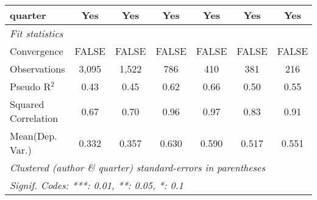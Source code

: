 \begin{tabular}{lcccccc}
   quarter                                                    & Yes           & Yes           & Yes           & Yes     & Yes           & Yes\\  
   \midrule
   \emph{Fit statistics}\\
   Convergence                                                &FALSE          & FALSE         & FALSE         & FALSE   & FALSE         & FALSE\\  
   Observations                                               & 3,095         & 1,522         & 786           & 410     & 381           & 216\\  
   Pseudo R$^2$                                               & 0.43          & 0.45          & 0.62          & 0.66    & 0.50          & 0.55\\  
   Squared Correlation                                        & 0.67          & 0.70          & 0.96          & 0.97    & 0.83          & 0.91\\  
Mean(Dep. Var.) & 0.332 & 0.357 & 0.630 & 0.590 & 0.517 & 0.551 \\
   \midrule \midrule
   \multicolumn{7}{l}{\emph{Clustered (author \& quarter) standard-errors in parentheses}}\\
   \multicolumn{7}{l}{\emph{Signif. Codes: ***: 0.01, **: 0.05, *: 0.1}}\\
\end{tabular}
\par\endgroup
